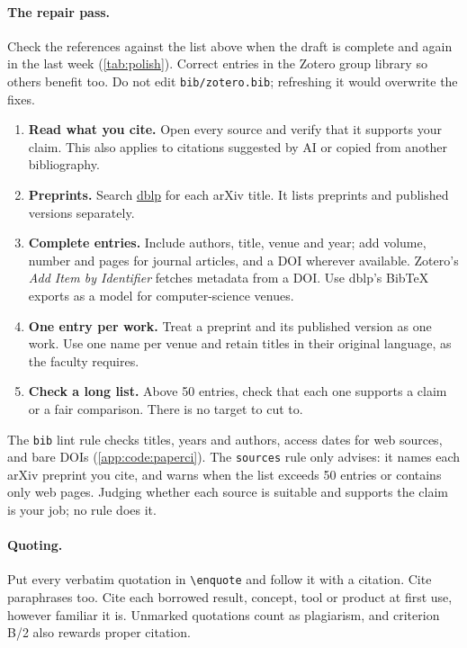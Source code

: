 \paragraph{The repair pass.} Check the references against the list above when the draft is complete and again in the last week (\cref{tab:polish}). Correct entries in the Zotero group library so others benefit too. Do not edit \texttt{bib/zotero.bib}; refreshing it would overwrite the fixes.
\begin{enumerate}
  \item \textbf{Read what you cite.} Open every source and verify that it supports your claim. This also applies to citations suggested by AI or copied from another bibliography.
  \item \textbf{Preprints.} Search \href{https://dblp.org/}{dblp} for each arXiv title. It lists preprints and published versions separately.
  \item \textbf{Complete entries.} Include authors, title, venue and year; add volume, number and pages for journal articles, and a DOI wherever available. Zotero's \emph{Add Item by Identifier} fetches metadata from a DOI. Use dblp's BibTeX exports as a model for computer-science venues.
  \item \textbf{One entry per work.} Treat a preprint and its published version as one work. Use one name per venue and retain titles in their original language, as the faculty requires.
  \item \textbf{Check a long list.} Above 50 entries, check that each one supports a claim or a fair comparison. There is no target to cut to.
\end{enumerate}
The \texttt{bib} lint rule checks titles, years and authors, access dates for web sources, and bare DOIs (\cref{app:code:paperci}). The \texttt{sources} rule only advises: it names each arXiv preprint you cite, and warns when the list exceeds 50 entries or contains only web pages. Judging whether each source is suitable and supports the claim is your job; no rule does it.

\paragraph{Quoting.} Put every verbatim quotation in \texttt{\textbackslash enquote} and follow it with a citation. Cite paraphrases too. Cite each borrowed result, concept, tool or product at first use, however familiar it is. Unmarked quotations count as plagiarism, and criterion B/2 also rewards proper citation.

